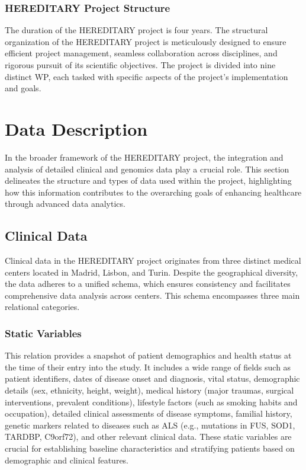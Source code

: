 \subsubsection{\ac{HEREDITARY} Project Structure}
The duration of the \ac{HEREDITARY} project is four years. The structural organization of the \ac{HEREDITARY} project is meticulously designed to ensure efficient project management, seamless collaboration across disciplines, and rigorous pursuit of its scientific objectives. The project is divided into nine distinct \ac{WP}, each tasked with specific aspects of the project's implementation and goals.

\section{Data Description}
In the broader framework of the \ac{HEREDITARY} project, the integration and analysis of detailed clinical and genomics data play a crucial role. This section delineates the structure and types of data used within the project, highlighting how this information contributes to the overarching goals of enhancing healthcare through advanced data analytics.
\subsection{Clinical Data}
Clinical data in the \ac{HEREDITARY} project originates from three distinct medical centers located in Madrid, Lisbon, and Turin. Despite the geographical diversity, the data adheres to a unified schema, which ensures consistency and facilitates comprehensive data analysis across centers. This schema encompasses three main relational categories.
\subsubsection{Static Variables}
This relation provides a snapshot of patient demographics and health status at the time of their entry into the study. It includes a wide range of fields such as patient identifiers, dates of disease onset and diagnosis, vital status, demographic details (sex, ethnicity, height, weight), medical history (major traumas, surgical interventions, prevalent conditions), lifestyle factors (such as smoking habits and occupation), detailed clinical assessments of disease symptoms, familial history, genetic markers related to diseases such as \ac{ALS} (e.g., mutations in FUS, SOD1, TARDBP, C9orf72), and other relevant clinical data. These static variables are crucial for establishing baseline characteristics and stratifying patients based on demographic and clinical features.
